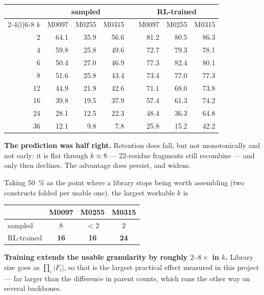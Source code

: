 \begin{center}
\begin{tabular}{rrrrcrrr}
\toprule
& \multicolumn{3}{c}{sampled} & & \multicolumn{3}{c}{RL-trained} \\
\cmidrule(r){2-4}\cmidrule(l){6-8}
$k$ & M0097 & M0255 & M0315 & & M0097 & M0255 & M0315 \\
\midrule
2  & 64.1 & 35.9 & 56.6 & & 81.2 & 80.5 & 86.3 \\
4  & 59.8 & 25.8 & 49.6 & & 72.7 & 79.3 & 78.1 \\
6  & 50.4 & 27.0 & 46.9 & & 77.3 & 82.4 & 80.1 \\
8  & 51.6 & 25.8 & 43.4 & & 73.4 & 77.0 & 77.3 \\
12 & 44.9 & 21.9 & 42.6 & & 71.1 & 68.0 & 73.8 \\
16 & 39.8 & 19.5 & 37.9 & & 57.4 & 61.3 & 74.2 \\
24 & 28.1 & 12.5 & 22.3 & & 48.4 & 36.3 & 64.8 \\
36 & 12.1 &  9.8 &  7.8 & & 25.8 & 15.2 & 42.2 \\
\bottomrule
\end{tabular}
\end{center}

\textbf{The prediction was half right.} Retention does fall, but not
monotonically and not early: it is flat through $k \approx 8$ --- 22-residue
fragments still recombine --- and only then declines. The advantage does
persist, and widens.

Taking \SI{50}{\percent} as the point where a library stops being worth
assembling (two constructs folded per usable one), the largest workable $k$ is

\begin{center}
\begin{tabular}{lccc}
\toprule
 & M0097 & M0255 & M0315 \\
\midrule
sampled     & 8  & $<2$ & 2  \\
RL-trained  & \textbf{16} & \textbf{16} & \textbf{24} \\
\bottomrule
\end{tabular}
\end{center}

\textbf{Training extends the usable granularity by roughly $2$--$8\times$ in
$k$.} Library size goes as $\prod_i |F_i|$, so that is the largest practical
effect measured in this project --- far larger than the difference in parent
counts, which runs the other way on several backbones.



